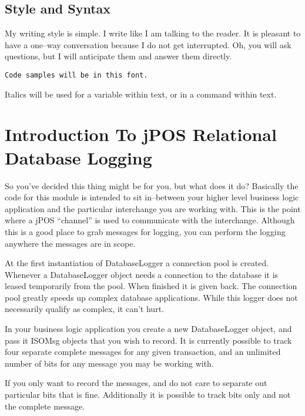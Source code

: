 \documentclass[11pt]{report}
\begin{document}
\begin{flushleft}
        \subsection{Style and Syntax}
        My writing style is simple.  I write like I am talking to the reader.
        It is pleasant to have a one--way conversation because I do not get
        interrupted.  Oh, you will ask questions, but I will anticipate them
        and answer them directly.  

        \begin{verbatim}Code samples will be in this font.\end{verbatim}

        \begin{slshape}Italics will be used for a variable within text, or in
        a command within text.\end{slshape}

    \section{Introduction To jPOS Relational Database Logging}
        So you've decided this thing might be for you, but what does it do?
        Basically the code for this module is intended to sit in--between your
        higher level business logic application and the particular interchange 
        you are working with.  This is the point where a jPOS ``channel'' is 
        used to communicate with the interchange.  Although this is a good 
        place to grab messages for logging, you can perform the logging 
        anywhere the messages are in scope.  

        At the first instantiation of DatabaseLogger a connection pool is
        created.  Whenever a DatabaseLogger object needs a connection to the
        database it is leased temporarily from the pool.  When finished it is
        given back.  The connection pool greatly speeds up complex database
        applications.  While this logger does not necessarily qualify as 
        complex, it can't hurt.  

        In your business logic application you create a new
        DatabaseLogger object, and pass it ISOMsg objects that you wish to
        record.  It is currently possible to track four separate complete
        messages for any given transaction, and an unlimited number of bits for
        any message you may be working with.  

        If you only want to record
        the messages, and do not care to separate out particular bits that is
        fine.  Additionally it is possible to track bits only and not the
        complete message.  


\end{flushleft}
\end{document}
